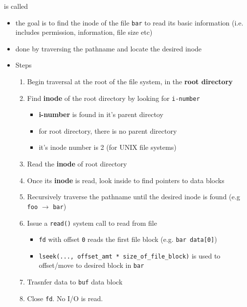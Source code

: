 \documentclass[12pt]{article}
\begin{document}
\bigskip

is called

\bigskip

\begin{itemize}
    \item the goal is to find the inode of the file \texttt{bar} to read its basic information
    (i.e. includes permission, information, file size etc)
    \item done by traversing the pathname and locate the desired inode
    \item Steps

    \begin{enumerate}[1.]
        \item Begin traversal at the root of the file system, in the \textbf{root directory}

        \item Find \textbf{inode} of the root directory by looking for \texttt{i-number}

        \begin{itemize}
            \item \textbf{i-number} is found in it's parent directoy
            \item for root directory, there is no parent directory
            \item it's inode number is 2 (for UNIX file systems)
        \end{itemize}

        \item Read the \textbf{inode} of root directory
        \item Once its \textbf{inode} is read, look inside to find pointers
        to data blocks
        \item Recursively traverse the pathname until the desired inode is found (e.g \texttt{foo} $\to$ \texttt{bar})
        \item Issue a \texttt{read()} system call to read from file

        \begin{itemize}
            \item \texttt{fd} with offset \texttt{0} reads the first file block (e.g. \texttt{bar data[0]})
            \item \texttt{lseek(..., offset\_amt * size\_of\_file\_block)} is used to offset/move to desired block in \texttt{bar}
        \end{itemize}

        \item Trasnfer data to \texttt{buf} data block

        \item Close \texttt{fd}. No I/O is read.
    \end{enumerate}
\end{itemize}
\end{document}
